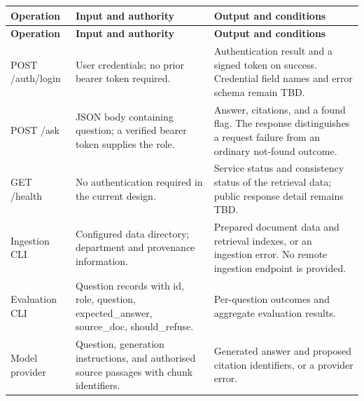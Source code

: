 \documentclass[11pt,letterpaper]{article}
\begin{document}
\begin{longtable}{|P{\arrayrulewidth\relax}|P{\arrayrulewidth\relax}|P{\arrayrulewidth\relax}|}

\hline{}

\textbf{Operation} & \textbf{Input and authority} & \textbf{Output and conditions} \\ \hline

\endfirsthead

\hline{}

\textbf{Operation} & \textbf{Input and authority} & \textbf{Output and conditions} \\ \hline

\endhead

\hline\endfoot

\hline\endlastfoot

POST /auth/login & User credentials; no prior bearer token required. & Authentication result and a signed token on success. Credential field names and error schema remain TBD. \\ \hline

POST /ask & JSON body containing question; a verified bearer token supplies the role. & Answer, citations, and a found flag. The response distinguishes a request failure from an ordinary not-found outcome. \\ \hline

GET /health & No authentication required in the current design. & Service status and consistency status of the retrieval data; public response detail remains TBD. \\ \hline

Ingestion CLI & Configured data directory; department and provenance information. & Prepared document data and retrieval indexes, or an ingestion error. No remote ingestion endpoint is provided. \\ \hline

Evaluation CLI & Question records with id, role, question, expected\_answer, source\_doc, should\_refuse. & Per-question outcomes and aggregate evaluation results. \\ \hline

Model provider & Question, generation instructions, and authorised source passages with chunk identifiers. & Generated answer and proposed citation identifiers, or a provider error. \\ \hline

\end{longtable}
\end{document}
